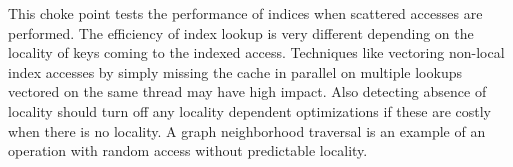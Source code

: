 
This choke point tests the performance of indices when scattered accesses are
performed. The efficiency of index lookup is very different depending on the
locality of keys coming to the indexed access. Techniques like vectoring
non-local index accesses by simply missing the cache in parallel on multiple
lookups vectored on the same thread may have high impact. Also detecting absence
of locality should turn off any locality dependent optimizations if these are
costly when there is no locality. A graph neighborhood traversal is an example
of an operation with random access without predictable locality.


